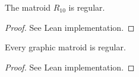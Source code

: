\begin{theorem}
    \label{matroidR10.isRegular}
    \leanok
    The matroid $R_{10}$ is regular.
\end{theorem}

\begin{proof}
    \leanok
    See Lean implementation.
\end{proof}

\begin{theorem}
    \label{Matroid.IsGraphic.isRegular}
    \leanok
    Every graphic matroid is regular.
\end{theorem}

\begin{proof}
    \leanok
    See Lean implementation.
\end{proof}
